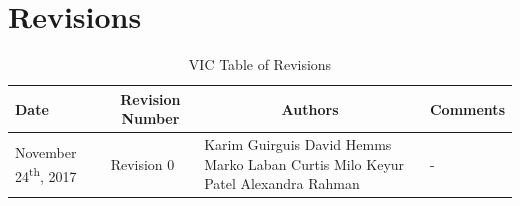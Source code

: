 \documentclass [10pt]{article}
\begin{document}

\pagebreak


\tableofcontents
\listoftables
\listoffigures



\pagebreak


\thispagestyle{empty}
\section{Revisions}
\begin{longtable}{| p{ } | p{ } | p{ } | p{ } |} \caption{VIC Table of Revisions}  \\

\hline 
\centering \textbf{Date} & 
\multicolumn{1}{c}{\textbf {Revision Number}} &
\multicolumn{1}{|c}{\textbf {Authors}} & 
\multicolumn{1}{|c|}{\textbf {Comments}} \\ \hline

\multirow{4}{*}{\centering November 24\textsuperscript{th}, 2017}  & 
\multirow{4}{*}{Revision 0}& 
		{Karim Guirguis \newline
		David Hemms \newline
		Marko Laban \newline
		Curtis Milo \newline
		Keyur Patel \newline
		Alexandra Rahman}
 &
 
\multirow{4}{*}{-} \\ 
\hline 

\end{longtable}



\pagebreak

\end{document}
